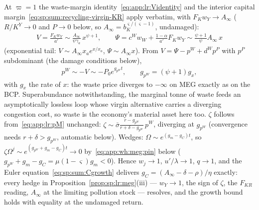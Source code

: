  At $\varpi=1$ the waste-margin
identity~\eqref{eq:app:lr:Videntity} and the interior capital
margin~\eqref{eq:sp:sum:recycling-virgin-KR} apply verbatim, with $F_Kw_Y\to A_\infty$
($R/K^Y\to0$ and $P\to0$ below, so $A_\infty=b_K^{\varsigma/\left(\varsigma-1\right)}$,
undamaged):
\begin{align}
V=\frac{F_Kw_Y}{a'}\sim\frac{A_\infty}{\psi\gamma_a}\,x^{\psi+1},
\qquad
\Psi=c^Ww_W+\frac{1-\alpha}{a'}F_Kw_Y\sim\frac{\psi+1}{\psi}A_\infty\,x
\label{eq:app:wh:meg:VPsi}
\end{align}
(exponential tail: $V\sim A_\infty x_ae^{x/x_a}$, $\Psi\sim A_\infty x$). From
$V=\Psi-p^W+d^Wp^P$ with $p^P$ subdominant (the damage conditions below),
\begin{align}
p^W\sim-V\sim-P_0e^{g_{p^W}t},
\qquad
g_{p^W}=\left(\psi+1\right)g_x,
\label{eq:app:wh:meg:pW}
\end{align}
with $g_x$ the rate of $x$: the waste price diverges to $-\infty$ on MEG exactly as on the
BCP. Superabundance notwithstanding, the marginal tonne of waste feeds an asymptotically
lossless loop whose virgin alternative carries a diverging congestion cost, so waste is the
economy's material asset here too. $\zeta$ follows from~\eqref{eq:app:lr:pM} unchanged:
$\zeta\sim\bar\sigma\frac{r-g_{p^W}}{r+\delta-g_{p^W}}\,p^W$, diverging at $g_{p^W}$
(convergence needs $r+\delta>g_{p^W}$, automatic below). Wedges:
$\Omega\sim e^{\left(g_m-g_C\right)t}$, so
$\zeta\Omega^j\sim e^{\left(g_{p^W}+g_m-g_C\right)t}\to0$
by~\eqref{eq:app:wh:meg:pin} below ($g_{p^W}+g_m-g_C=\mu\left(1-\varsigma\right)g_m<0$).
Hence $w_j\to1$, $u'/\lambda\to1$, $q\to1$, and the Euler
equation~\eqref{eq:sp:sum:Cgrowth} delivers
$g_C=\left(A_\infty-\delta-\rho\right)/\eta$ exactly: every hedge in
Proposition~\ref{prop:sp:lr:meg}(iii) --- $w_Y\to1$, the sign of $\zeta$, the $F_{KR}$
reading, $A_\infty$ at the limiting pollution stock --- resolves, and the growth bound holds
with equality at the undamaged return.

